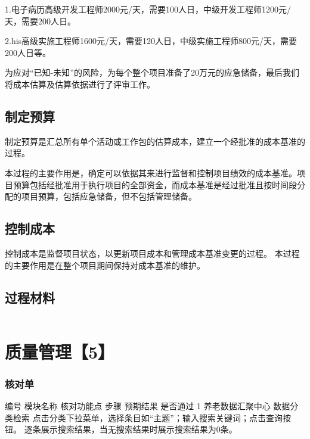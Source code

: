 \documentclass[UTF8]{../computerUniverse}
\begin{document}
1.电子病历高级开发工程师2000元/天，需要100人日，中级开发工程师1200元/天，需要200人日。

2.his高级实施工程师1600元/天，需要120人日，中级实施工程师800元/天，需要200人日等。

为应对“已知-未知”的风险，为每个整个项目准备了20万元的应急储备，最后我们将成本估算及估算依据进行了评审工作。


\section{制定预算}

制定预算是汇总所有单个活动或工作包的估算成本，建立一个经批准的成本基准的过程。

本过程的主要作用是，确定可以依据其来进行监督和控制项目绩效的成本基准。项目预算包括经批准用于执行项目的全部资金，而成本基准是经过批准且按时间段分配的项目预算，包括应急储备，但不包括管理储备。


\section{控制成本}

控制成本是监督项目状态，以更新项目成本和管理成本基准变更的过程。
本过程的主要作用是在整个项目期间保持对成本基准的维护。










\section{过程材料}
\begin{lstlisting}
\end{lstlisting}




\chapter{质量管理【5】}

\subsection{核对单}

编号    模块名称            核对功能点  步骤    预期结果    是否通过
1       养老数据汇聚中心    数据分类检索    
点击分类下拉菜单，选择条目如“主题”；输入搜索关键词；点击查询按钮。
逐条展示搜索结果，当无搜索结果时展示搜索结果为0条。
\end{document}
